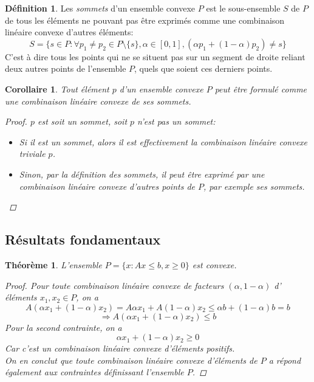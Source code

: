 \documentclass[a4paper]{report}
\theoremstyle{definition}
\newtheorem*{definition}{Définition}
\theoremstyle{remark}
\theoremstyle{plain}
\newtheorem{theorem}{Théorème}
\newtheorem{corollary}{Corollaire}
\begin{document}
\begin{definition}
Les \emph{sommets} d'un ensemble convexe \(P\) est le sous-ensemble \(S\) de
\(P\) de tous les éléments ne pouvant pas être exprimés comme une combinaison
linéaire convexe d'autres éléments:
\[S=\{s\in P:\forall p_1\neq p_2\in P\setminus\{s\},\alpha\in[0,1],(\alpha
p_1+(1-\alpha)p_2)\neq s\}\] C'est à dire tous les points qui ne se situent pas
sur un segment de droite reliant deux autres points de l'ensemble \(P\), quels
que soient ces derniers points.
\end{definition}

\begin{corollary}
Tout élément \(p\) d'un ensemble convexe \(P\) peut être formulé comme une
combinaison linéaire convexe de ses sommets.
\begin{proof}
\(p\) est soit un sommet, soit \(p\) n'est pas un sommet:
\begin{itemize}
	\item Si il est un sommet, alors il est effectivement la combinaison
	linéaire convexe triviale \(p\).
	\item Sinon, par la définition des sommets, il peut être exprimé par
	une combinaison linéaire convexe d'autres points de \(P\), par exemple ses
	sommets.
\end{itemize}
\end{proof}
\end{corollary}

\subsection{Résultats fondamentaux}
\begin{theorem}
\label{P is convex}
L'ensemble \(P = \{x:Ax\le b,x\ge 0\}\) est convexe.
\begin{proof}
Pour toute combinaison linéaire convexe de facteurs \((\alpha, 1-\alpha)\)
d' éléments \(x_1,x_2 \in P\), on a
\[A(\alpha x_1+(1-\alpha)x_2) = A\alpha x_1 + A(1-\alpha)x_2
\le \alpha b + (1-\alpha) b = b\]
\[\Rightarrow A(\alpha x_1+(1-\alpha)x_2) \le b\]
Pour la second contrainte, on a
\[\alpha x_1+(1-\alpha)x_2\ge 0\]
Car c'est un combinaison linéaire convexe d'éléments positifs.\\
On en conclut que toute combinaison linéaire convexe d'éléments de \(P\) a
répond également aux contraintes définissant l'ensemble \(P\).

\end{proof}
\end{theorem}
\end{document}
